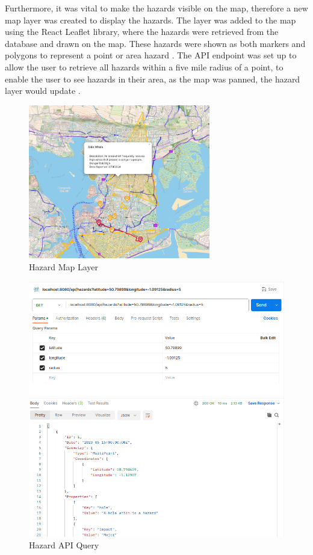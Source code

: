 Furthermore, it was vital to make the hazards visible on the map, therefore a new map layer was created to display the hazards. The layer was added to the map using the React Leaflet library, where the hazards were retrieved from the database and drawn on the map. These hazards were shown as both markers and polygons to represent a point or area hazard . The API endpoint was set up to allow the user to retrieve all hazards within a five mile radius of a point, to enable the user to see hazards in their area, as the map was panned, the hazard layer would update .

\begin{figure}[!ht]
  \centering
  \includegraphics[width=300px]{figures/Progress Images/Iteration-2/SR32-37/sr32-hazard-popup.png}
  \caption{Hazard Map Layer}
  \label{fig:hazard-layer}
\end{figure}

\begin{figure}[!ht]
  \centering
  \includegraphics[width=425px]{figures/Progress Images/Iteration-2/SR32-37/SR32 - Basic API further developed.png}
  \caption{Hazard API Query}
  \label{fig:hazard-API}
\end{figure}

